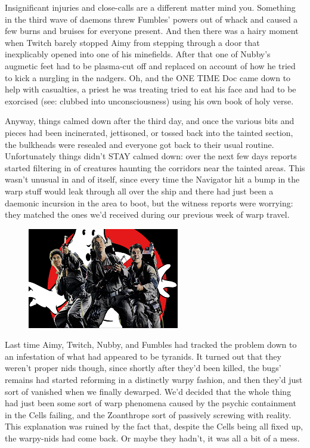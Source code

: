 Insignificant injuries and close-calls are a different matter mind you. 
Something in the third wave of daemons threw Fumbles' powers out of whack and caused a few burns and bruises for everyone present. 
And then there was a hairy moment when Twitch barely stopped Aimy from stepping through a door that inexplicably opened into one of his minefields. 
After that one of Nubby's augmetic feet had to be plasma-cut off and replaced on account of how he tried to kick a nurgling in the nadgers. 
Oh, and the ONE TIME Doc came down to help with casualties, a priest he was treating tried to eat his face and had to be exorcised (see: 
clubbed into unconsciousness) using his own book of holy verse.

Anyway, things calmed down after the third day, and once the various bits and pieces had been incinerated, jettisoned, or tossed back into the tainted section, the bulkheads were resealed and everyone got back to their usual routine. 
Unfortunately things didn't STAY calmed down: 
over the next few days reports started filtering in of creatures haunting the corridors near the tainted areas. 
This wasn't unusual in and of itself, since every time the Navigator hit a bump in the warp stuff would leak through all over the ship and there had just been a daemonic incursion in the area to boot, but the witness reports were worrying: 
they matched the ones we'd received during our previous week of warp travel.

\begin{figure}
	\begin{center}
		\includegraphics[width=\figwidth]{pics/15/12.png}
	\end{center}
\end{figure}
Last time Aimy, Twitch, Nubby, and Fumbles had tracked the problem down to an infestation of what had appeared to be tyranids. 
It turned out that they weren't proper nids though, since shortly after they'd been killed, the bugs' remains had started reforming in a distinctly warpy fashion, and then they'd just sort of vanished when we finally dewarped. 
We'd decided that the whole thing had just been some sort of warp phenomena caused by the psychic containment in the Cells failing, and the Zoanthrope sort of passively screwing with reality. 
This explanation was ruined by the fact that, despite the Cells being all fixed up, the warpy-nids had come back. 
Or maybe they hadn't, it was all a bit of a mess. 


